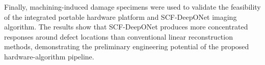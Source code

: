 \begin{englishabstract}
Finally, machining-induced damage specimens were used to validate the feasibility of the integrated portable hardware platform and SCF-DeepONet imaging algorithm. The results show that SCF-DeepONet produces more concentrated responses around defect locations than conventional linear reconstruction methods, demonstrating the preliminary engineering potential of the proposed hardware-algorithm pipeline.

	
\noindent{}
\end{englishabstract}